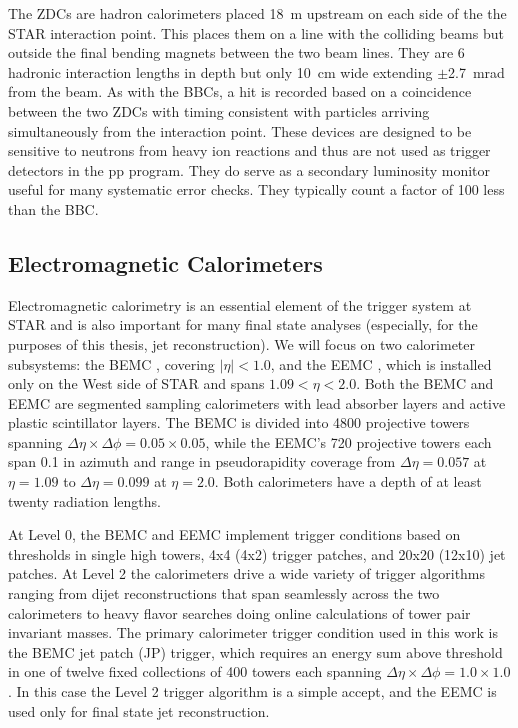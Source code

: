 The ZDCs \cite{Adler:2003sp} are hadron calorimeters placed 18~m upstream on
each side of the the STAR interaction point. This places them on a line with
the colliding beams but outside the final bending magnets between the two beam
lines. They are 6 hadronic interaction lengths in depth but only 10~cm wide
extending $\pm$2.7~mrad from the beam. As with the BBCs, a hit is recorded
based on a coincidence between the two ZDCs with timing consistent with
particles arriving simultaneously from the interaction point. These devices
are designed to be sensitive to neutrons from heavy ion reactions and thus are
not used as trigger detectors in the pp program. They do serve as a secondary
luminosity monitor useful for many systematic error checks. They typically
count a factor of 100 less than the BBC.

\subsection{Electromagnetic Calorimeters}

Electromagnetic calorimetry is an essential element of the trigger system at
STAR and is also important for many final state analyses (especially, for the
purposes of this thesis, jet reconstruction). We will focus on two calorimeter
subsystems: the BEMC \cite{Beddo:2002zx}, covering $|\eta| < 1.0$, and the
EEMC \cite{Allgower:2002zy}, which is installed only on the West side of STAR
and spans $1.09 < \eta < 2.0$. Both the BEMC and EEMC are segmented sampling
calorimeters with lead absorber layers and active plastic scintillator layers.
The BEMC is divided into 4800 projective towers spanning $\Delta \eta \times
\Delta \phi = 0.05 \times 0.05$, while the EEMC's 720 projective towers each
span 0.1 in azimuth and range in pseudorapidity coverage from $\Delta \eta =
0.057$ at $\eta = 1.09$ to $\Delta \eta = 0.099$ at $\eta = 2.0$. Both
calorimeters have a depth of at least twenty radiation lengths.

At Level 0, the BEMC and EEMC implement trigger conditions based on thresholds
in single high towers, 4x4 (4x2) trigger patches, and 20x20 (12x10) jet
patches. At Level 2 the calorimeters drive a wide variety of trigger
algorithms ranging from dijet reconstructions that span seamlessly across the
two calorimeters to heavy flavor searches doing online calculations of tower
pair invariant masses. The primary calorimeter trigger condition used in this
work is the BEMC jet patch (JP) trigger, which requires an energy sum above
threshold in one of twelve fixed collections of 400 towers each spanning
$\Delta \eta \times \Delta \phi = 1.0 \times 1.0$. In this case the Level 2
trigger algorithm is a simple accept, and the EEMC is used only for final
state jet reconstruction.

